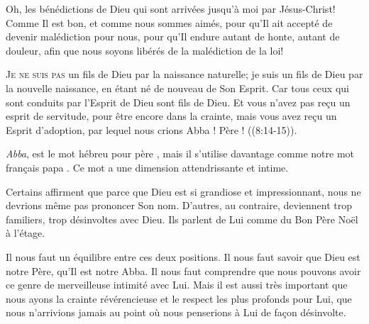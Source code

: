 
Oh, les bénédictions de Dieu qui sont arrivées jusqu'à moi
 par Jésus-Christ! Comme Il est bon, et comme nous sommes aimés,
 pour qu'Il ait accepté de devenir malédiction pour nous,
 pour qu'Il endure autant de honte, autant de douleur,
 afin que nous soyons libérés de la malédiction de la loi!

\dvrule







\lettrine{J}{e ne suis pas} un fils de Dieu par la naissance naturelle;
 je suis un fils de Dieu par la nouvelle naissance, en étant né de nouveau
 de Son Esprit.
 \Og Car tous ceux qui sont conduits par l'Esprit de Dieu sont fils de Dieu.
 Et vous n'avez pas re\c{c}u un esprit de servitude, pour être encore
 dans la crainte, mais vous avez re\c{c}u un Esprit d'adoption, par lequel
 nous crions\frcolon{} \Og Abba ! Père ! \Fg{} ((8:14-15)).

\emph{Abba}, est le mot hébreu pour \Og père \Fg{},
 mais il s'utilise davantage comme notre mot fran\c{c}ais \Og papa \Fg{}.
 Ce mot a une dimension attendrissante et intime.


Certains affirment que parce que Dieu est si grandiose et impressionnant,
 nous ne devrions même pas prononcer Son nom. D'autres, au contraire,
 deviennent trop familiers, trop désinvoltes avec Dieu.
 Ils parlent de Lui comme du \Og Bon Père Noël à l'étage. \Fg{}

Il nous faut un équilibre entre ces deux positions.
 Il nous faut savoir que Dieu est notre Père, qu'Il est notre Abba.
 Il nous faut comprendre que nous pouvons avoir ce genre de merveilleuse
 intimité avec Lui. Mais il est aussi très important que nous ayons
 la crainte révérencieuse et le respect les plus profonds pour Lui,
 que nous n'arrivions jamais au point où nous penserions à Lui
 de fa\c{c}on désinvolte.

